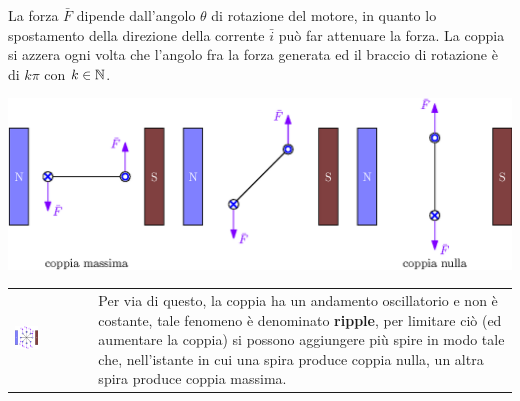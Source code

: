 \documentclass[10pt, letterpaper]{report}
\begin{document}
La forza $\bar F$ dipende dall'angolo $\theta$ di rotazione del motore, in quanto lo spostamento della direzione della corrente $\bar i$ può far attenuare la forza. La coppia si azzera ogni volta che 
l'angolo fra la forza generata ed il braccio di rotazione è di $k\pi$ con $k\in{\mathbb N}$.
\begin{center}
    \includegraphics[width=1\textwidth ]{images/variazioneCoppia.eps}
\end{center}
\begin{center}
	\begin{tabular}{>{\centering\arraybackslash}m{3in}>{\arraybackslash}m{3in}}
        \includegraphics[width=0.33\textwidth ]{images/variazioneCoppia2.eps} & Per via di questo, la coppia ha un andamento oscillatorio e non è costante, tale fenomeno è denominato \textbf{ripple}, per limitare ciò (ed aumentare la coppia) si possono aggiungere più spire in modo tale che, nell'istante in cui una spira produce coppia nulla, un altra spira produce coppia massima.
		\\
	\end{tabular}
\end{center}
\end{document}
